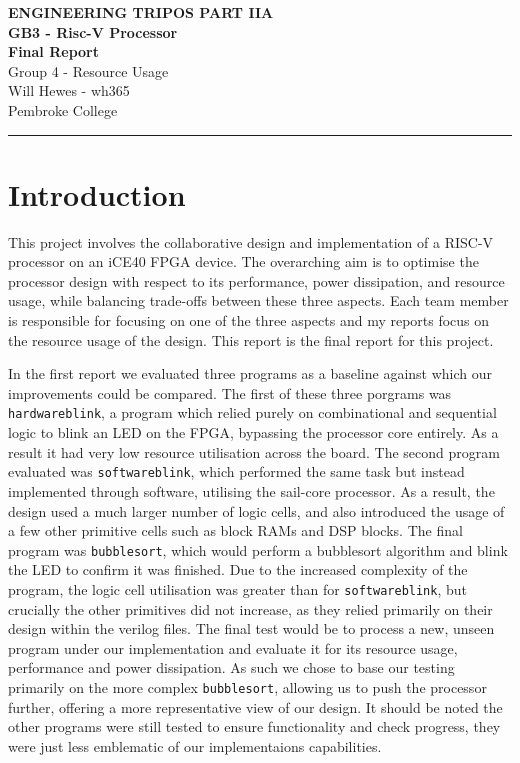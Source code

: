 \documentclass[a4paper,10pt]{article}
\renewcommand{\maketitle}{
    \begin{center}
        \LARGE \textbf{ENGINEERING TRIPOS PART IIA} \\ 
        \vspace{0.5em}
        \Large \textbf{GB3 - Risc-V Processor} \\ 
        \vspace{0.5em}
        \textbf{Final Report} \\
        \large Group 4 - Resource Usage \\
        \vspace{1em}
        \large Will Hewes - wh365 \\ 
        Pembroke College \\ 
        \vspace{0.5em}
    \end{center}
}
\begin{document}

\maketitle
\hrule
\tableofcontents
\newpage
{} \setcounter{page}{1}

\section{Introduction}
\label{sec:Introduction}

This project involves the collaborative design and implementation 
of a RISC-V processor on an iCE40 FPGA device. 
The overarching aim is to optimise 
the processor design with respect to its 
performance, power dissipation, and resource usage, 
while balancing trade-offs between these three aspects. 
Each team member is responsible for focusing on one of the three aspects
and my reports focus on the resource usage of the design.
This report is the final report for this project.

In the first report we evaluated three programs as a baseline against
which our improvements could be compared.
The first of these three porgrams was \texttt{hardwareblink},
a program which relied purely on combinational and sequential logic
to blink an LED on the FPGA,
bypassing the processor core entirely. 
As a result it had very low resource utilisation across the board.
The second program evaluated was \texttt{softwareblink},
which performed the same task but instead implemented through software,
utilising the sail-core processor.
As a result, the design used a much larger number of logic cells,
and also introduced the usage of a few other primitive cells such as 
block RAMs and DSP blocks.
The final program was \texttt{bubblesort}, which would perform a 
bubblesort algorithm and blink the LED to confirm it was finished.
Due to the increased complexity of the program,
the logic cell utilisation was greater than for \texttt{softwareblink},
but crucially the other primitives did not increase, 
as they relied primarily on their design within the verilog files.
The final test would be to process 
a new, unseen program under our implementation and evaluate it for its 
resource usage, performance and power dissipation.
As such we chose to base our testing primarily 
on the more complex \texttt{bubblesort},
allowing us to push the processor further,
offering a more representative view of our design.
It should be noted the other programs were still tested
to ensure functionality and check progress,
they were just less emblematic of our implementaions capabilities.
\end{document}
